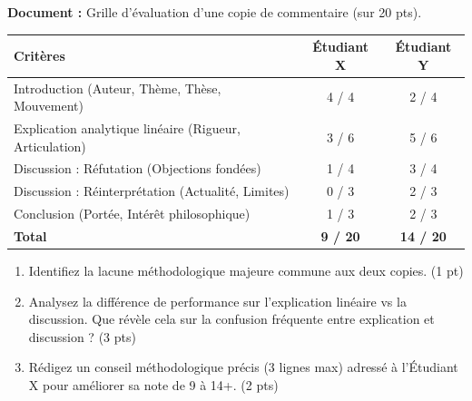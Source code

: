 \documentclass[11pt]{article}
\begin{document}
\begin{exercice}
\textbf{Document :} Grille d'évaluation d'une copie de commentaire (sur 20 pts).
\begin{center}
\begin{tabular}{|l|c|c|}
\hline
\textbf{Critères} & \textbf{Étudiant X} & \textbf{Étudiant Y} \\ \hline
Introduction (Auteur, Thème, Thèse, Mouvement) & 4 / 4 & 2 / 4 \\ \hline
Explication analytique linéaire (Rigueur, Articulation) & 3 / 6 & 5 / 6 \\ \hline
Discussion : Réfutation (Objections fondées) & 1 / 4 & 3 / 4 \\ \hline
Discussion : Réinterprétation (Actualité, Limites) & 0 / 3 & 2 / 3 \\ \hline
Conclusion (Portée, Intérêt philosophique) & 1 / 3 & 2 / 3 \\ \hline
\textbf{Total} & \textbf{9 / 20} & \textbf{14 / 20} \\ \hline
\end{tabular}
\end{center}
\begin{enumerate}
    \item Identifiez la lacune méthodologique majeure commune aux deux copies. (1 pt)
    \item Analysez la différence de performance sur l'explication linéaire vs la discussion. Que révèle cela sur la confusion fréquente entre explication et discussion ? (3 pts)
    \item Rédigez un conseil méthodologique précis (3 lignes max) adressé à l'Étudiant X pour améliorer sa note de 9 à 14+. (2 pts)
\end{enumerate}
\end{exercice}
\end{document}
